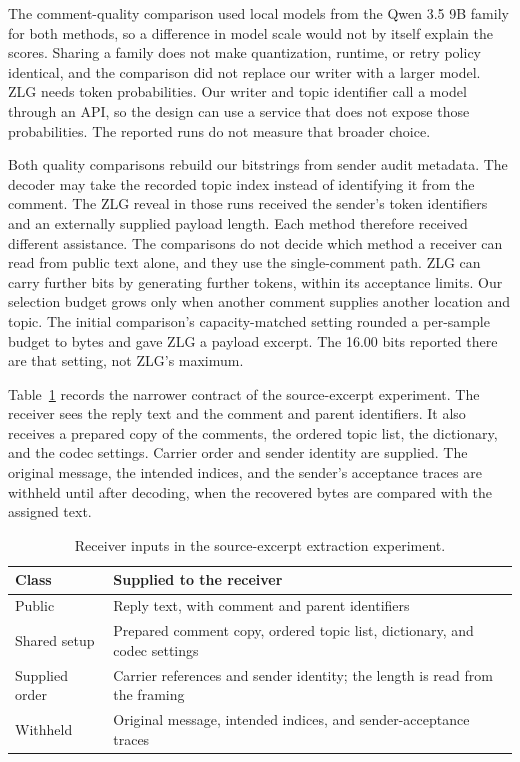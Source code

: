 \documentclass[3p,times,procedia]{elsarticle}
\begin{document}
The comment-quality comparison used local models from the Qwen 3.5 9B family for both methods, so a difference in model scale would not by itself explain the scores. Sharing a family does not make quantization, runtime, or retry policy identical, and the comparison did not replace our writer with a larger model. ZLG needs token probabilities. Our writer and topic identifier call a model through an API, so the design can use a service that does not expose those probabilities. The reported runs do not measure that broader choice.

Both quality comparisons rebuild our bitstrings from sender audit metadata. The decoder may take the recorded topic index instead of identifying it from the comment. The ZLG reveal in those runs received the sender's token identifiers and an externally supplied payload length. Each method therefore received different assistance. The comparisons do not decide which method a receiver can read from public text alone, and they use the single-comment path. ZLG can carry further bits by generating further tokens, within its acceptance limits. Our selection budget grows only when another comment supplies another location and topic. The initial comparison's capacity-matched setting rounded a per-sample budget to bytes and gave ZLG a payload excerpt. The 16.00 bits reported there are that setting, not ZLG's maximum.

Table~\ref{tab:contract} records the narrower contract of the source-excerpt experiment. The receiver sees the reply text and the comment and parent identifiers. It also receives a prepared copy of the comments, the ordered topic list, the dictionary, and the codec settings. Carrier order and sender identity are supplied. The original message, the intended indices, and the sender's acceptance traces are withheld until after decoding, when the recovered bytes are compared with the assigned text.

\begin{table}[t]
\centering
\caption{Receiver inputs in the source-excerpt extraction experiment.}
\label{tab:contract}
\begin{tabular}{lp{}}
\toprule
Class & Supplied to the receiver \\
\midrule
Public & Reply text, with comment and parent identifiers \\
Shared setup & Prepared comment copy, ordered topic list, dictionary, and codec settings \\
Supplied order & Carrier references and sender identity; the length is read from the framing \\
Withheld & Original message, intended indices, and sender-acceptance traces \\
\bottomrule
\end{tabular}
\end{table}
\end{document}
